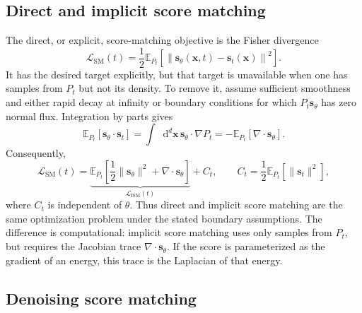 \documentclass[11pt]{article}
\newcommand{\vct}[1]{\bm{#1}}
\newcommand{\dd}{\mathop{}\!\mathrm{d}}
\begin{document}
\subsection{Direct and implicit score matching}

The direct, or explicit, score-matching objective is the Fisher divergence
\begin{equation}
    \mathcal{L}_{\mathrm{SM}}(t)
    =\frac{1}{2}\mathbb{E}_{P_t}\!\left[
      \left\lVert\vct{s}_{\theta}(\vct{x},t)
      -\vct{s}_t(\vct{x})\right\rVert^2\right].
    \label{eq:direct-score-matching}
\end{equation}
It has the desired target explicitly, but that target is unavailable when one
has samples from \(P_t\) but not its density. To remove it, assume sufficient
smoothness and either rapid decay at infinity or boundary conditions for which
\(P_t\vct{s}_{\theta}\) has zero normal flux. Integration by parts gives
\begin{equation}
    \mathbb{E}_{P_t}[\vct{s}_{\theta}\cdot\vct{s}_t]
    =\int\dd^d\vct{x}\,\vct{s}_{\theta}\cdot\nabla P_t
    =-\mathbb{E}_{P_t}[\nabla\cdot\vct{s}_{\theta}].
    \label{eq:score-matching-integration-by-parts}
\end{equation}
Consequently,
\begin{equation}
    \mathcal{L}_{\mathrm{SM}}(t)
    =\underbrace{\mathbb{E}_{P_t}\!\left[
      \frac{1}{2}\lVert\vct{s}_{\theta}\rVert^2
      +\nabla\cdot\vct{s}_{\theta}\right]}_{
      \mathcal{L}_{\mathrm{ISM}}(t)}+C_t,
    \qquad
    C_t=\frac{1}{2}\mathbb{E}_{P_t}
      [\lVert\vct{s}_t\rVert^2],
    \label{eq:implicit-score-matching}
\end{equation}
where \(C_t\) is independent of \(\theta\). Thus direct and implicit score
matching are the same optimization problem under the stated boundary
assumptions. The difference is computational: implicit score matching uses
only samples from \(P_t\), but requires the Jacobian trace
\(\nabla\cdot\vct{s}_{\theta}\). If the score is parameterized as the gradient
of an energy, this trace is the Laplacian of that energy.

\subsection{Denoising score matching}
\end{document}
